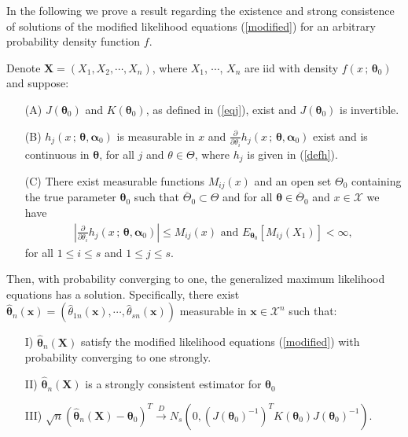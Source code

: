 \documentclass[lineno]{biometrika}
\newcommand{\bs}{\boldsymbol}
\begin{document}

In the following we prove a result regarding the existence and strong consistence of solutions of the modified likelihood equations (\ref{modified}) for an arbitrary probability density function $f$.

\begin{theorem}\label{coprinc} Denote $\bs{X}=\left(X_1, X_2, \cdots, X_n\right)$, where $X_1$, $\cdots$, $X_n$ are iid with density $f(x\,;\,\bs{\theta}_0)$ and suppose:
\begin{itemize}

\item[(A)]  $J(\bs{\theta}_0)$ and $K(\bs{\theta}_0)$, as defined in (\ref{eqj}), exist and $J(\bs{\theta}_0)$ is invertible.
\item[(B)] $h_j(x\, ;\, \bs{\theta},\bs{\alpha}_0)$ is measurable in $x$ and $\frac{\partial}{\partial \theta_i}h_j(x\, ;\, \bs{\theta},\bs{\alpha}_0)$ exist and is continuous in $\bs{\theta}$, for all $j$ and $\theta\in \Theta$, where $h_j$ is given in (\ref{defh}).
\item[(C)] There exist measurable functions $M_{ij}(x)$ and an open set $\Theta_0$ containing the true parameter $\bs{\theta}_0$ such that $\overline{\Theta}_0\subset \Theta$ and for all $\bs{\theta}\in \overline{\Theta}_0$ and $x\in \mathcal{X}$ we have
\begin{equation*}
 \begin{aligned}
 \left|\frac{\partial}{\partial\theta_i} h_j(x\, ;\, \bs{\theta},\bs{\alpha}_0)\right|\leq M_{ij}(x)\mbox{ and }E_{\bs{\theta}_0}\left[M_{ij}(X_1)\right]<\infty,
 \end{aligned}
 \end{equation*}
for all $1\leq i\leq s$ and $1\leq j\leq s$.
\end{itemize}
Then, with probability converging to one, the generalized maximum likelihood equations has a solution. Specifically, there exist  $\bs{\hat{\theta}}_n(\bs{x})=(\hat{\theta}_{1n}(\bs{x}),\cdots,\hat{\theta}_{sn}(\bs{x}))$ measurable in $\bs{x}\in \mathcal{X}^n$ such that:
\begin{itemize}
\item[I)] $\bs{\hat{\theta}}_n(\bs{X})$ satisfy the modified likelihood equations (\ref{modified}) with probability converging to one strongly.
\item[II)] $\bs{\hat{\theta}}_n(\bs{X})$ is a strongly consistent estimator for $\bs{\theta}_0$
\item[III)]
$\sqrt{n}(\bs{\hat{\theta}}_n(\bs{X})-\bs{\theta}_0)^T\overset{D}{\to} N_s\left(0,(J(\bs{\theta}_0)^{-1})^T K(\bs{\theta}_0)J(\bs{\theta}_0)^{-1}\right)$.
\end{itemize}
\end{theorem}
\end{document}
